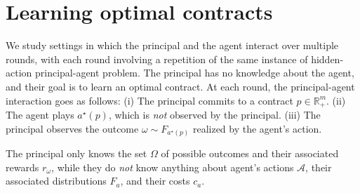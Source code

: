 \section{Learning optimal contracts}\label{sec:learning_problem}
We study settings in which the principal and the agent interact over multiple rounds, with each round involving a repetition of the same instance of hidden-action principal-agent problem.
%
The principal has no knowledge about the agent, and their goal is to learn an optimal contract.
%
At each round, the principal-agent interaction goes as follows: (i) The principal commits to a contract $p \in \mathbb{R}^{m}_{+}$. (ii) The agent plays $a^\star(p)$, which is \emph{not} observed by the principal. (iii) The principal observes the outcome $\omega \sim F_{a^\star(p)}$ realized by the agent's action.

%
The principal only knows the set $\Omega$ of possible outcomes and their associated rewards $r_\omega$, while they do \emph{not} know anything about agent's actions $\mathcal{A}$, their associated distributions $F_a$, and their costs $c_a$. 
%
%


